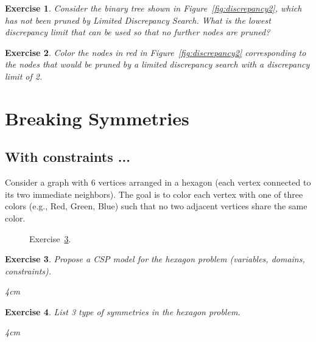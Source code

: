 \documentclass{article}
\newtheorem{exercise}{Exercise}[section]
\begin{document}
    \begin{exercise}
        Consider the binary tree shown in Figure~\ref{fig:discrepancy2},
        which has not been pruned by Limited Discrepancy Search.
        What is the lowest discrepancy limit that can be used so that no further nodes are pruned?
        \label{ex:discrepancy2}
    \end{exercise}

    \begin{exercise}
        Color the nodes in red in Figure~\ref{fig:discrepancy2} corresponding to the nodes that would be pruned by
        a limited discrepancy search with a discrepancy limit of 2.
        \label{ex:discrepancy3}
    \end{exercise}



    \section{Breaking Symmetries}

    \subsection{With constraints ...}

    Consider a graph with 6 vertices arranged in a hexagon (each vertex connected to its two immediate neighbors).
    The goal is to color each vertex with one of three colors (e.g., Red, Green, Blue)
    such that no two adjacent vertices share the same color.

    \begin{figure}[h!tbp]
        \centering
        
        \caption{Exercise~\ref{ex:symmetry1}.}
        \label{fig:symmetry1}
    \end{figure}

    \begin{exercise}
        Propose a CSP model for the hexagon problem (variables, domains, constraints).
        \begin{answerbox}[title=Answer]{4cm}
        \end{answerbox}
        \label{ex:symmetry1}
    \end{exercise}


    \begin{exercise}
        List 3 type of symmetries in the hexagon problem.
        \begin{answerbox}[title=Answer]{4cm}
        \end{answerbox}
        \label{ex:symmetry2}
    \end{exercise}
\end{document}
